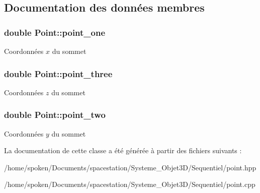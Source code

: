 \subsection{Documentation des données membres}
\hypertarget{class_point_a030522c3949dc71bc4c1f39eb1b0c77e}{
\subsubsection[{point\-\_\-one}]{\setlength{\rightskip}{0pt plus 5cm}double Point\-::point\-\_\-one\hspace{0.3cm}{\ttfamily [private]}}}\label{class_point_a030522c3949dc71bc4c1f39eb1b0c77e}
Coordonnées $ x$ du sommet \hypertarget{class_point_af7cb3c4c0c0f52218ac9ce180df003da}{
\subsubsection[{point\-\_\-three}]{\setlength{\rightskip}{0pt plus 5cm}double Point\-::point\-\_\-three\hspace{0.3cm}{\ttfamily [private]}}}\label{class_point_af7cb3c4c0c0f52218ac9ce180df003da}
Coordonnées $ z$ du sommet \hypertarget{class_point_a7eece7f7413a741137cf32bb763f3987}{
\subsubsection[{point\-\_\-two}]{\setlength{\rightskip}{0pt plus 5cm}double Point\-::point\-\_\-two\hspace{0.3cm}{\ttfamily [private]}}}\label{class_point_a7eece7f7413a741137cf32bb763f3987}
Coordonnées $ y$ du sommet 

La documentation de cette classe a été générée à partir des fichiers suivants \-:\begin{DoxyCompactItemize}
\item 
/home/spoken/\-Documents/spacestation/\-Systeme\-\_\-\-Objet3\-D/\-Sequentiel/point.\-hpp\item 
/home/spoken/\-Documents/spacestation/\-Systeme\-\_\-\-Objet3\-D/\-Sequentiel/point.\-cpp\end{DoxyCompactItemize}
